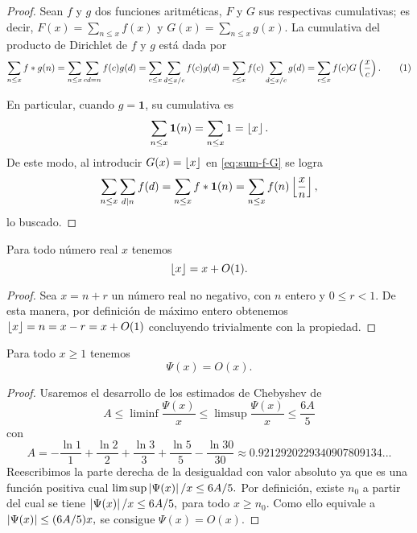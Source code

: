 \begin{proof}
  Sean \(f\) y \(g\) dos funciones aritm\'eticas,
  \(F\) y \(G\) sus respectivas cumulativas;
  es decir, \(F(x) = \sum_{n \leq x} f(x)\) y
  \(G(x) = \sum_{n \leq x} g(x)\).
  La cumulativa del producto de Dirichlet de \(f\) y \(g\) est\'a dada por 
  \[
    \sum_{n \leq x} f * g (n) = \sum_{n \leq x} \sum_{cd = n} f(c)g(d)
    = \sum_{c \leq x} \sum_{d \leq x/c} f(c) g(d)
    = \sum_{c \leq x} f(c) \sum_{d \leq x/c} g(d)
    = \sum_{c \leq x} f(c) G\parentheses{\frac{x}{c}}.
    \eqlabel{eq:sum-f-G}
  \]

  En particular, cuando \(g = \mathbf{1}\), su cumulativa es
  \[
    \sum_{n \leq x} \mathbf{1}(n) = \sum_{n \leq x} 1 = \left\lfloor x \right\rfloor.
  \]
  De este modo, al introducir \(G(x) = \left\lfloor x \right\rfloor\) en \eqref{eq:sum-f-G} se logra
  \[
    \sum_{n \leq x} \sum_{d \mid n} f(d)
    = \sum_{n \leq x} f * \mathbf{1} (n)
    = \sum_{n \leq x} f(n) \left\lfloor \frac{x}{n} \right\rfloor,
  \]
  lo buscado.
\end{proof}

\begin{lemma}
  \label{lem:floor-is-x-o1}
  Para todo n\'umero real \(x\) tenemos
  \[
    \left\lfloor x \right\rfloor = x + O(1).
  \]
\end{lemma}

\begin{proof}
  Sea \(x = n + r\) un n\'umero real no negativo, con
  \(n\) entero y \(0 \leq r < 1\).
  De esta manera, por definici\'on de m\'aximo entero obtenemos
  \(
    \left\lfloor x \right\rfloor = n = x - r = x + O(1)
  \)
  concluyendo trivialmente con la propiedad.
\end{proof}

\begin{lemma}
  \label{lem:psi-is-ox}
  Para todo \(x \geq 1\) tenemos
  \[
    \Psi(x) = O(x).
  \]
\end{lemma}

\begin{proof}
  Usaremos el desarrollo de los estimados de Chebyshev de \cite{Diamond1982}
  \[
    A \leq \liminf \frac{\Psi(x)}{x} \leq \limsup \frac{\Psi(x)}{x} \leq \frac{6A}{5}
  \]
  con
  \[
    A = -\frac{\ln 1}{1} + \frac{\ln 2}{2} + \frac{\ln 3}{3} + \frac{\ln 5}{5} - \frac{\ln 30}{30}
    \approx 0.9212920229340907809134...
  \]
  Reescribimos la parte derecha de la desigualdad con valor absoluto ya que es una funci\'on positiva cual
  \(
    \limsup \left\lvert \Psi(x) \right\rvert/x \leq 6A/5.
  \)
  Por definici\'on, existe \(n_0\) a partir del cual se tiene
  \(
    \left\lvert \Psi(x) \right\rvert/x \leq 6A/5,
  \)
  para todo \(x \geq n_0\).
  Como ello equivale a
  \(
    \left\lvert \Psi(x) \right\rvert \leq (6A/5) x,
  \)
  se consigue \(\Psi(x) = O(x)\).
\end{proof}

